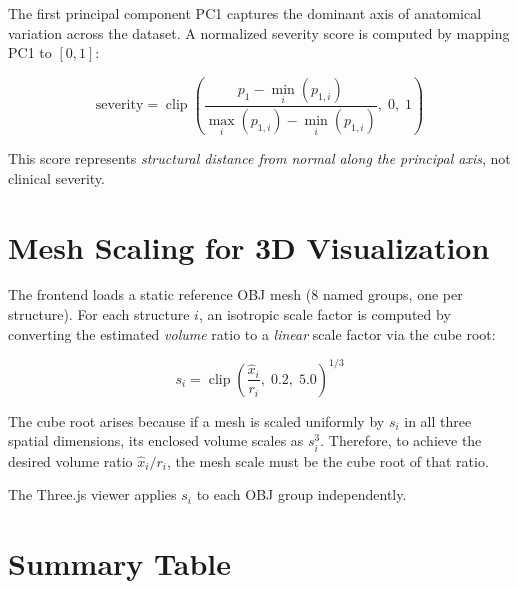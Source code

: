 \documentclass[11pt]{article}
\begin{document}
The first principal component PC1 captures the dominant axis of anatomical
variation across the dataset. A normalized severity score is computed by
mapping PC1 to $[0, 1]$:

\begin{equation}
    \text{severity} = \operatorname{clip}\!\left(
        \frac{p_1 - \min_i(p_{1,i})}{\max_i(p_{1,i}) - \min_i(p_{1,i})},\; 0,\; 1
    \right)
\end{equation}

This score represents \emph{structural distance from normal along the principal
axis}, not clinical severity.

\section{Mesh Scaling for 3D Visualization}

The frontend loads a static reference OBJ mesh (8 named groups, one per structure).
For each structure $i$, an isotropic scale factor is computed by converting the
estimated \emph{volume} ratio to a \emph{linear} scale factor via the cube root:

\begin{equation}
    s_i = \operatorname{clip}\!\left(\frac{\hat{x}_i}{r_i},\; 0.2,\; 5.0\right)^{\!1/3}
\end{equation}

The cube root arises because if a mesh is scaled uniformly by $s_i$ in all
three spatial dimensions, its enclosed volume scales as $s_i^3$. Therefore,
to achieve the desired volume ratio $\hat{x}_i / r_i$, the mesh scale must be
the cube root of that ratio.

The Three.js viewer applies $s_i$ to each OBJ group independently.

\section{Summary Table}
\end{document}
